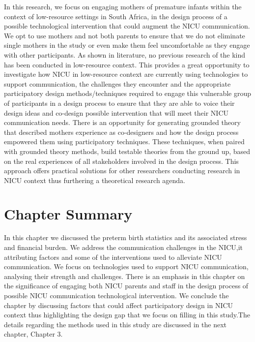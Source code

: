 In this research, we focus on engaging mothers of premature infants within the context of low-resource settings in South Africa, in the design process of a possible technological intervention that could augment the NICU communication. We opt to use mothers and not both parents to ensure that we do not eliminate single mothers in the study or even make them feel uncomfortable as they engage with other participants. As shown in literature, no previous research of the kind has been conducted in low-resource context. This provides a  great opportunity to investigate how NICU in low-resource context are currently using technologies to support communication, the challenges they encounter and the appropriate participatory design methods/techniques required to engage this vulnerable group of participants in a design process to ensure that they are able to voice their design ideas and co-design possible intervention that will meet their NICU communication needs. There is an opportunity  for generating grounded theory that described mothers experience as co-designers and how the design process empowered them using participatory techniques. These techniques, when paired with grounded theory methods, build testable theories from the ground up, based on the real experiences of all stakeholders involved in the design process. This approach offers practical solutions for other researchers conducting research in NICU context thus furthering a theoretical research agenda.

\section{Chapter Summary}
In this chapter we discussed the preterm birth statistics and its associated stress and financial burden. We address the communication challenges in the NICU,it attributing factors and some of the interventions used to alleviate NICU communication. We focus on technologies used to support NICU communication, analysing their strength and challenges. There is an emphasis in this chapter on the significance of engaging both NICU parents and staff in the design process of possible NICU communication technological intervention. We conclude the chapter by discussing factors that could affect participatory design in NICU context thus highlighting the design gap that we focus on filling in this study.The details regarding the methods used in this study are discussed in the next chapter, Chapter 3. 








 

